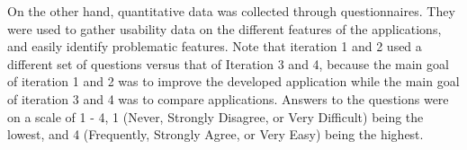 		
		On the other hand, quantitative data was collected through questionnaires. They were used to gather usability data on the different features of the applications, and easily identify problematic features. Note that iteration 1 and 2 used a different set of questions versus that of Iteration 3 and 4, because the main goal of iteration 1 and 2 was to improve the developed application while the main goal of iteration 3 and 4 was to compare applications. Answers to the questions were on a scale of 1 - 4, 1 (Never, Strongly Disagree, or Very Difficult) being the lowest, and 4 (Frequently, Strongly Agree, or Very Easy) being the highest. 

